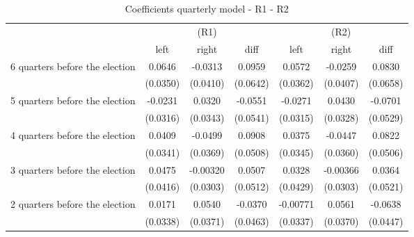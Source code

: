 \begin{table}[!ht]\centering \footnotesize
\def\sym#1{\ifmmode^{#1}\else\(^{#1}\)\fi}
\caption{Coefficients quarterly model - R1 - R2}
\begin{tabular}{l*{6}{c}}
\hline\hline
                    &\multicolumn{3}{c}{(R1)}&\multicolumn{3}{c}{(R2)}\\
                    &\multicolumn{1}{c}{left}&\multicolumn{1}{c}{right}&\multicolumn{1}{c}{diff}&\multicolumn{1}{c}{left}&\multicolumn{1}{c}{right}&\multicolumn{1}{c}{diff}\\
\hline
 6 quarters before the election&      0.0646         &     -0.0313         &      0.0959         &      0.0572         &     -0.0259         &      0.0830         \\
                    &    (0.0350)         &    (0.0410)         &    (0.0642)         &    (0.0362)         &    (0.0407)         &    (0.0658)         \\
[0.5em]
 5 quarters before the election&     -0.0231         &      0.0320         &     -0.0551         &     -0.0271         &      0.0430         &     -0.0701         \\
                    &    (0.0316)         &    (0.0343)         &    (0.0541)         &    (0.0315)         &    (0.0328)         &    (0.0529)         \\
[0.5em]
 4 quarters before the election&      0.0409         &     -0.0499         &      0.0908         &      0.0375         &     -0.0447         &      0.0822         \\
                    &    (0.0341)         &    (0.0369)         &    (0.0508)         &    (0.0345)         &    (0.0360)         &    (0.0506)         \\
[0.5em]
 3 quarters before the election&      0.0475         &    -0.00320         &      0.0507         &      0.0328         &    -0.00366         &      0.0364         \\
                    &    (0.0416)         &    (0.0303)         &    (0.0512)         &    (0.0429)         &    (0.0303)         &    (0.0521)         \\
[0.5em]
 2 quarters before the election&      0.0171         &      0.0540         &     -0.0370         &    -0.00771         &      0.0561         &     -0.0638         \\
                    &    (0.0338)         &    (0.0371)         &    (0.0463)         &    (0.0337)         &    (0.0370)         &    (0.0447)         \\

\end{tabular}
\end{table}
